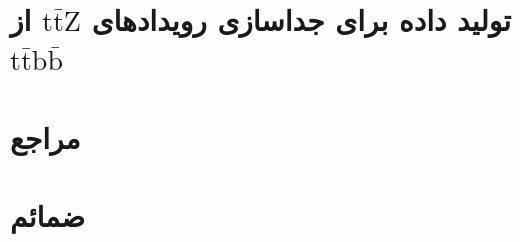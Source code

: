 \documentclass[14pt]{report}
\newcommand{\ttbb}{\ensuremath{\mathrm{t}\bar{\mathrm{t}}\mathrm{b}\bar{\mathrm{b}}}\xspace}
\newcommand{\ttZ}{\ensuremath{\mathrm{t}\bar{\mathrm{t}}\mathrm{Z}}\xspace}
\begin{document}

\newpage
\tableofcontents
\newpage




\chapter{تولید داده برای جداسازی رویدادهای \ttZ از \ttbb}
\label{ch:data}







% 

\newpage
\chapter*{مراجع}
\begin{latin}
\printbibliography[heading=none]
\end{latin}

\appendix
\chapter*{ضمائم}
\setcounter{section}{0}\setcounter{figure}{0}\setcounter{table}{0}\setcounter{equation}{0}
\renewcommand{\thesection}{\arabic{section}}
\renewcommand{\thefigure}{پ.\arabic{figure}}
\renewcommand{\thetable}{پ.\arabic{table}}
\renewcommand{\theequation}{پ.\arabic{equation}}



\end{document}
